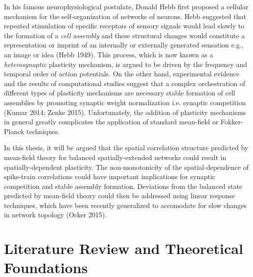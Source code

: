 \documentclass{ucetd}
\begin{document}
In his famous neurophysiological postulate, Donald Hebb first proposed a cellular mechanism for the self-organization of networks of neurons. Hebb suggested that repeated stimulation of specific receptors of sensory signals would lead slowly to the formation of a \emph{cell assembly} and these structural changes would constitute a representation or imprint of an internally or externally generated sensation e.g., an image or idea (Hebb 1949). This process, which is now known as a \emph{heterosynaptic} plasticity mechanism, is argued to be driven by the frequency and temporal order of action potentials. On the other hand, experimental evidence and the results of computational studies suggest that a complex orchestration of different types of plasticity mechanisms are necessary stable formation of cell assemblies by promoting synaptic weight normalization i.e. synaptic competition (Kumar 2014; Zenke 2015). Unfortunately, the addition of plasticity mechanisms in general greatly complicates the application of standard mean-field or Fokker-Planck techniques. 

In this thesis, it will be argued that the spatial correlation structure predicted by mean-field theory for balanced spatially-extended networks could result in spatially-dependent plasticity. The non-monotonicity of the spatial-dependence of spike-train correlations could have important implications for synaptic competition and stable assembly formation. Deviations from the balanced state predicted by mean-field theory could then be addressed using linear response techniques, which have been recently generalized to accomodate for slow changes in network topology (Ocker 2015).


\section{Literature Review and Theoretical Foundations}
\end{document}
